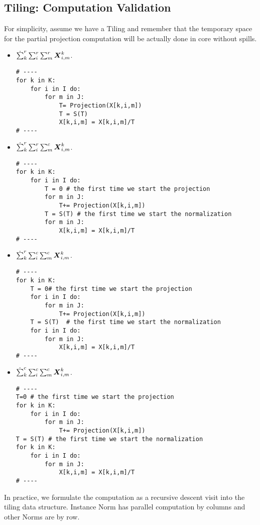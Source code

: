 \documentclass[acmsmall]{acmart}
\begin{document}
\subsection{Tiling: Computation Validation}
For simplicity, assume we have a Tiling and remember that the
temporary space for the partial projection computation will be
actually done in core without spills.
\begin{itemize}
\item $\dot\sum_k^r\sum_{i}^r\sum_{m}^r{\boldsymbol X}^{k}_{i,m}$. 
\begin{verbatim}
# ----
for k in K: 
    for i in I do: 
        for m in J: 
            T= Projection(X[k,i,m]) 
            T = S(T)
            X[k,i,m] = X[k,i,m]/T
# ----
\end{verbatim} 
\item $\dot\sum_k^r\sum_{i}^r\sum_{m}^c{\boldsymbol X}^{k}_{i,m}$. 
\begin{verbatim}
# ----
for k in K: 
    for i in I do: 
        T = 0 # the first time we start the projection      
        for m in J: 
            T+= Projection(X[k,i,m]) 
        T = S(T) # the first time we start the normalization
        for m in J: 
            X[k,i,m] = X[k,i,m]/T
# ----
\end{verbatim} 
\item $\dot\sum_k^r\sum_{i}^c\sum_{m}^c{\boldsymbol X}^{k}_{i,m}$. 
\begin{verbatim}
# ----
for k in K: 
    T = 0# the first time we start the projection 
    for i in I do: 
        for m in J: 
            T+= Projection(X[k,i,m]) 
    T = S(T)  # the first time we start the normalization
    for i in I do: 
        for m in J: 
            X[k,i,m] = X[k,i,m]/T
# ----
\end{verbatim} 
\item $\dot\sum_k^c\sum_{i}^c\sum_{m}^c{\boldsymbol X}^{k}_{i,m}$. 
\begin{verbatim}
# ----
T=0 # the first time we start the projection
for k in K: 
    for i in I do: 
        for m in J: 
            T+= Projection(X[k,i,m]) 
T = S(T) # the first time we start the normalization
for k in K: 
    for i in I do: 
        for m in J: 
            X[k,i,m] = X[k,i,m]/T
# ----
\end{verbatim}
\end{itemize}

In practice, we formulate the computation as a recursive descent visit
into the tiling data structure. Instance Norm has parallel computation
by columns and other Norms  are by row. 
\end{document}
